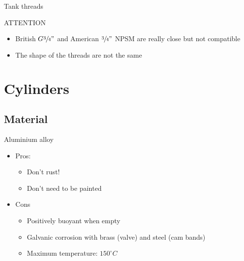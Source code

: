 \documentclass[aspectratio=1610,english,12pt]{beamer}
\begin{document}
\begin{frame}{Tank threads}
	\begin{block}{ATTENTION}
		\begin{itemize}
			\item British $G \sfrac{3}{4}"$ and American $\sfrac{3}{4}"$ NPSM are really close but not 	compatible
			\item	The shape of the threads are not the same
		\end{itemize}
	\end{block}
\end{frame}

\section{Cylinders}

\subsection{Material}

\begin{frame}{Aluminium alloy}
	\begin{itemize}
		\item Pros:
			\begin{itemize}
				\item Don't rust!
				\item Don't need to be painted
			\end{itemize}
		\item Cons
			\begin{itemize}
				\item Positively buoyant when empty
				\item Galvanic corrosion with brass (valve) and steel (cam bands)
				\item Maximum temperature: $150^\circ C$
			\end{itemize}
	\end{itemize}
\end{frame}
\end{document}
